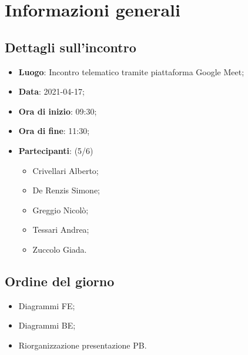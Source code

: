 \section{Informazioni generali}

\subsection{Dettagli sull'incontro}
\begin{itemize}
\item \textbf{Luogo}: Incontro telematico tramite piattaforma Google Meet;
\item \textbf{Data}: 2021-04-17;
\item \textbf{Ora di inizio}: 09:30;
\item \textbf{Ora di fine}: 11:30;
\item \textbf{Partecipanti}: (5/6) 
\begin{itemize}
	\item Crivellari Alberto;
	\item De Renzis Simone;
	\item Greggio Nicolò;
	\item Tessari Andrea;
	\item Zuccolo Giada.
\end{itemize}
\end{itemize}

\subsection{Ordine del giorno}
\begin{itemize}
	\item Diagrammi FE;
	\item Diagrammi BE;
	\item Riorganizzazione presentazione PB.
\end{itemize}


